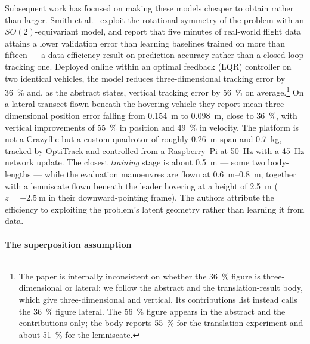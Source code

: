Subsequent work has focused on making these models cheaper to obtain rather than larger. Smith et
al.~\cite{smith2023so2equivariant} exploit the rotational symmetry of the problem with an
$SO(2)$-equivariant model, and report that five minutes of real-world flight data attains a lower
validation error than learning baselines trained on more than fifteen --- a data-efficiency result
on prediction accuracy rather than a closed-loop tracking one. Deployed online within an optimal
feedback (LQR) controller on two identical vehicles, the model reduces three-dimensional tracking
error by \SI{36}{\percent} and, as the abstract states, vertical tracking error by
\SI{56}{\percent} on average.\footnote{The paper is internally inconsistent on whether the
\SI{36}{\percent} figure is three-dimensional or lateral: we follow the abstract and the
translation-result body, which give three-dimensional and vertical. Its contributions list instead
calls the \SI{36}{\percent} figure lateral. The \SI{56}{\percent} figure appears in the abstract
and the contributions only; the body reports \SI{55}{\percent} for the translation experiment and
about \SI{51}{\percent} for the lemniscate.} On a lateral transect flown beneath the hovering
vehicle they report mean three-dimensional position error falling from \SI{0.154}{\metre} to
\SI{0.098}{\metre}, close to \SI{36}{\percent}, with vertical improvements of \SI{55}{\percent} in
position and \SI{49}{\percent} in velocity. The
platform is not a Crazyflie but a custom quadrotor of roughly \SI{0.26}{\metre} span and
\SI{0.7}{\kilo\gram}, tracked by OptiTrack and controlled from a Raspberry~Pi at \SI{50}{\hertz}
with a \SI{45}{\hertz} network update. The closest \emph{training} stage is about
\SI{0.5}{\metre} --- some two body-lengths --- while the evaluation manoeuvres are flown at
\SIrange{0.6}{0.8}{\metre}, together with a lemniscate flown beneath the leader hovering at a
height of \SI{2.5}{\metre} (\(z = \SI{-2.5}{\metre}\) in their downward-pointing frame). The authors
attribute the efficiency to exploiting the problem's latent geometry rather than learning it from
data.

\label{sec:rw-superposition}
\paragraph{The superposition assumption}

